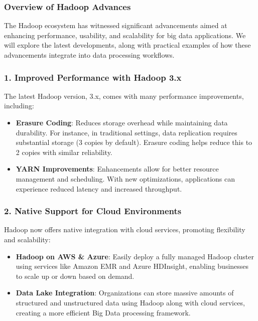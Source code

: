 \documentclass[aspectratio=169]{beamer}
\begin{document}
\begin{frame}[fragile]
    \frametitle{Overview of Hadoop Advances}
    The Hadoop ecosystem has witnessed significant advancements aimed at enhancing performance, usability, and scalability for big data applications. 
    We will explore the latest developments, along with practical examples of how these advancements integrate into data processing workflows.
\end{frame}

\begin{frame}[fragile]
    \frametitle{1. Improved Performance with Hadoop 3.x}
    The latest Hadoop version, 3.x, comes with many performance improvements, including:
    \begin{itemize}
        \item \textbf{Erasure Coding}: Reduces storage overhead while maintaining data durability. For instance, in traditional settings, data replication requires substantial storage (3 copies by default). Erasure coding helps reduce this to 2 copies with similar reliability.
        
        \item \textbf{YARN Improvements}: Enhancements allow for better resource management and scheduling. With new optimizations, applications can experience reduced latency and increased throughput.
    \end{itemize}
\end{frame}

\begin{frame}[fragile]
    \frametitle{2. Native Support for Cloud Environments}
    Hadoop now offers native integration with cloud services, promoting flexibility and scalability:
    \begin{itemize}
        \item \textbf{Hadoop on AWS \& Azure}: Easily deploy a fully managed Hadoop cluster using services like Amazon EMR and Azure HDInsight, enabling businesses to scale up or down based on demand.
        
        \item \textbf{Data Lake Integration}: Organizations can store massive amounts of structured and unstructured data using Hadoop along with cloud services, creating a more efficient Big Data processing framework.
    \end{itemize}
\end{frame}
\end{document}
